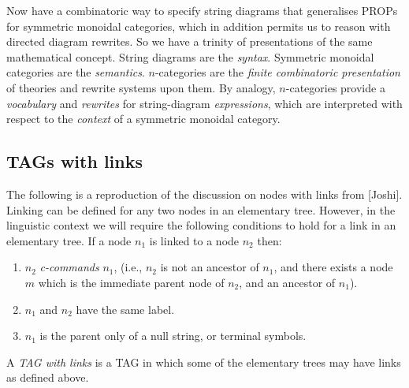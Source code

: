 \begin{remark}
Now have a combinatoric way to specify string diagrams that generalises PROPs for symmetric monoidal categories, which in addition permits us to reason with directed diagram rewrites. So we have a trinity of presentations of the same mathematical concept. String diagrams are the \emph{syntax}. Symmetric monoidal categories are the \emph{semantics}. $n$-categories are the \emph{finite combinatoric presentation} of theories and rewrite systems upon them. By analogy, $n$-categories provide a \emph{vocabulary} and \emph{rewrites} for string-diagram \emph{expressions}, which are interpreted with respect to the \emph{context} of a symmetric monoidal category.
\end{remark}

\subsection{TAGs with links}

\begin{defn}
The following is a reproduction of the discussion on nodes with links from [Joshi]. Linking can be defined for any two nodes in an elementary tree. However, in the linguistic context we will require the following conditions to hold for a link in an elementary tree. If a node $n_1$ is linked to a node $n_2$ then:
\begin{enumerate}
\item{$n_2$ \emph{c-commands} $n_1$, (i.e., $n_2$ is not an ancestor of $n_1$, and there exists a node $m$ which is the immediate parent node of $n_2$, and an ancestor of $n_1$).}
\item{$n_1$ and $n_2$ have the same label.}
\item{$n_1$ is the parent only of a null string, or terminal symbols.}
\end{enumerate}
A \emph{TAG with links} is a TAG in which some of the elementary trees may have links as defined above.
\end{defn}

